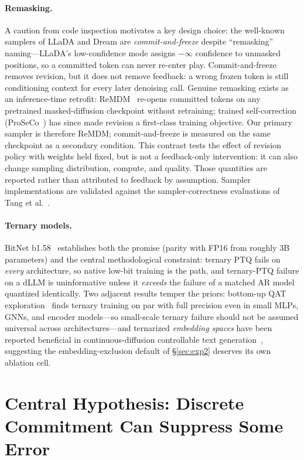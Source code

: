 \documentclass[11pt]{article}
\begin{document}
\paragraph{Remasking.} A caution from code inspection motivates a key design choice: the well-known samplers of LLaDA and Dream are \emph{commit-and-freeze} despite ``remasking'' naming---LLaDA's low-confidence mode assigns $-\infty$ confidence to unmasked positions, so a committed token can never re-enter play. Commit-and-freeze removes revision, but it does not remove feedback: a wrong frozen token is still conditioning context for every later denoising call. Genuine remasking exists as an inference-time retrofit: ReMDM~\cite{remdm} re-opens committed tokens on any pretrained masked-diffusion checkpoint without retraining; trained self-correction (ProSeCo~\cite{proseco}) has since made revision a first-class training objective. Our primary sampler is therefore ReMDM; commit-and-freeze is measured on the same checkpoint as a secondary condition. This contrast tests the effect of revision policy with weights held fixed, but is not a feedback-only intervention: it can also change sampling distribution, compute, and quality. Those quantities are reported rather than attributed to feedback by assumption. Sampler implementations are validated against the sampler-correctness evaluations of Tang et al.~\cite{dllmsampler}.

\paragraph{Ternary models.} BitNet b1.58~\cite{bitnet} establishes both the promise (parity with FP16 from roughly 3B parameters) and the central methodological constraint: ternary PTQ fails on \emph{every} architecture, so native low-bit training is the path, and ternary-PTQ failure on a dLLM is uninformative unless it \emph{exceeds} the failure of a matched AR model quantized identically. Two adjacent results temper the priors: bottom-up QAT exploration~\cite{nielsen} finds ternary training on par with full precision even in small MLPs, GNNs, and encoder models---so small-scale ternary failure should not be assumed universal across architectures---and ternarized \emph{embedding spaces} have been reported beneficial in continuous-diffusion controllable text generation~\cite{qecdlm}, suggesting the embedding-exclusion default of \S\ref{sec:exp2} deserves its own ablation cell.

\section{Central Hypothesis: Discrete Commitment Can Suppress Some Error}
\label{sec:hypothesis}
\end{document}
